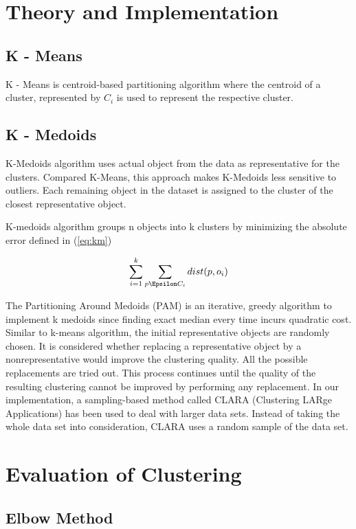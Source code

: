 \documentclass[12pt]{article}
\begin{document}
\section{Theory and Implementation}
\subsection{K - Means}
K - Means is centroid-based partitioning algorithm where the centroid of a cluster, represented by $C_i$ is used to represent the respective cluster.

\subsection{K - Medoids}
K-Medoids algorithm uses actual object from the data as representative for the clusters. Compared K-Means, this approach makes K-Medoids less sensitive to outliers. Each remaining object in the dataset is assigned to the cluster of the closest representative object.

K-medoids algorithm groups n objects into k clusters by minimizing the absolute error defined in (\ref{eq:km})

\begin{equation}
\label{eq:km}
 \sum_{i=1}^{k} \sum_{p \Epsilon C_i} dist(p,o_i)
\end{equation}

The Partitioning Around Medoids (PAM) is an iterative, greedy
algorithm to implement k medoids since finding exact median every time incurs quadratic cost. Similar to k-means algorithm, the initial representative objects are randomly
chosen. It is considered whether replacing a representative object by a nonrepresentative
 would improve the clustering quality. All the possible replacements
are tried out. This process continues until the quality of the resulting clustering cannot be improved by performing any replacement. In our implementation,  a sampling-based method called CLARA (Clustering LARge Applications) has been used to deal with larger data sets. Instead of taking the whole data set into consideration, CLARA uses a random sample of the data set.

\section{Evaluation of Clustering}

\subsection{Elbow Method}
\end{document}
